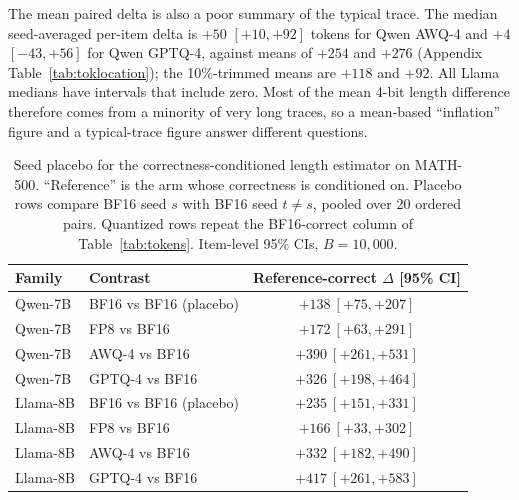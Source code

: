\documentclass[11pt,a4paper]{article}
\begin{document}
The mean paired delta is also a poor summary of the typical trace. The median seed-averaged per-item delta is $+50$ $[+10,+92]$ tokens for Qwen AWQ-4 and $+4$ $[-43,+56]$ for Qwen GPTQ-4, against means of $+254$ and $+276$ (Appendix Table~\ref{tab:toklocation}); the 10\%-trimmed means are $+118$ and $+92$. All Llama medians have intervals that include zero. Most of the mean 4-bit length difference therefore comes from a minority of very long traces, so a mean-based ``inflation'' figure and a typical-trace figure answer different questions.

\begin{table}[t]
\centering
\caption{Seed placebo for the correctness-conditioned length estimator on MATH-500. ``Reference'' is the arm whose correctness is conditioned on. Placebo rows compare BF16 seed $s$ with BF16 seed $t\neq s$, pooled over 20 ordered pairs. Quantized rows repeat the BF16-correct column of Table~\ref{tab:tokens}. Item-level 95\% CIs, $B=10{,}000$.}
\label{tab:placebo}
\small
\begin{tabular}{llc}
\toprule
\textbf{Family} & \textbf{Contrast} & \textbf{Reference-correct $\Delta$ [95\% CI]} \\
\midrule
Qwen-7B & BF16 vs BF16 (placebo) & $+138\ [+75,+207]$ \\
Qwen-7B & FP8 vs BF16 & $+172\ [+63,+291]$ \\
Qwen-7B & AWQ-4 vs BF16 & $+390\ [+261,+531]$ \\
Qwen-7B & GPTQ-4 vs BF16 & $+326\ [+198,+464]$ \\
\midrule
Llama-8B & BF16 vs BF16 (placebo) & $+235\ [+151,+331]$ \\
Llama-8B & FP8 vs BF16 & $+166\ [+33,+302]$ \\
Llama-8B & AWQ-4 vs BF16 & $+332\ [+182,+490]$ \\
Llama-8B & GPTQ-4 vs BF16 & $+417\ [+261,+583]$ \\
\bottomrule
\end{tabular}
\end{table}
\end{document}
